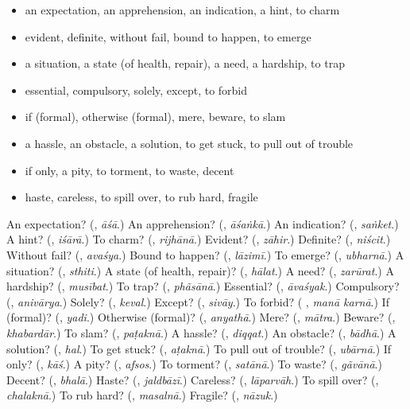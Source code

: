 \begin{itemize}
\raggedright
  \item an expectation, an apprehension, an indication, a hint, to charm
  \item evident, definite, without fail, bound to happen, to emerge
  \item a situation, a state (of health, repair), a need, a hardship, to trap
  \item essential, compulsory, solely, except, to forbid
  \item if (formal), otherwise (formal), mere, beware, to slam
  \item a hassle, an obstacle, a solution, to get stuck, to pull out of trouble
  \item if only, a pity, to torment, to waste, decent
  \item haste, careless, to spill over, to rub hard, fragile
\end{itemize}

\begin{tcolorbox}[breakable,colback=teal!4,colframe=teal!35!black,title={Before you move on}]
An expectation? (\textbf{}, \emph{āśā}.) An apprehension? (\textbf{}, \emph{āśaṅkā}.) An indication? (\textbf{}, \emph{saṅket}.) A hint? (\textbf{}, \emph{iśārā}.) To charm? (\textbf{}, \emph{rijhānā}.) Evident? (\textbf{}, \emph{zāhir}.) Definite? (\textbf{}, \emph{niścit}.) Without fail? (\textbf{}, \emph{avaśya}.) Bound to happen? (\textbf{}, \emph{lāzimī}.) To emerge? (\textbf{}, \emph{ubharnā}.) A situation? (\textbf{}, \emph{sthiti}.) A state (of health, repair)? (\textbf{}, \emph{hālat}.) A need? (\textbf{}, \emph{zarūrat}.) A hardship? (\textbf{}, \emph{musībat}.) To trap? (\textbf{}, \emph{phãsānā}.) Essential? (\textbf{}, \emph{āvaśyak}.) Compulsory? (\textbf{}, \emph{anivārya}.) Solely? (\textbf{}, \emph{keval}.) Except? (\textbf{}, \emph{sivāy}.) To forbid? (\textbf{ }, \emph{manā karnā}.) If (formal)? (\textbf{}, \emph{yadi}.) Otherwise (formal)? (\textbf{}, \emph{anyathā}.) Mere? (\textbf{}, \emph{mātra}.) Beware? (\textbf{}, \emph{khabardār}.) To slam? (\textbf{}, \emph{paṭaknā}.) A hassle? (\textbf{}, \emph{diqqat}.) An obstacle? (\textbf{}, \emph{bādhā}.) A solution? (\textbf{}, \emph{hal}.) To get stuck? (\textbf{}, \emph{aṭaknā}.) To pull out of trouble? (\textbf{}, \emph{ubārnā}.) If only? (\textbf{}, \emph{kāś}.) A pity? (\textbf{}, \emph{afsos}.) To torment? (\textbf{}, \emph{satānā}.) To waste? (\textbf{}, \emph{gãvānā}.) Decent? (\textbf{}, \emph{bhalā}.) Haste? (\textbf{}, \emph{jaldbāzī}.) Careless? (\textbf{}, \emph{lāparvāh}.) To spill over? (\textbf{}, \emph{chalaknā}.) To rub hard? (\textbf{}, \emph{masalnā}.) Fragile? (\textbf{}, \emph{nāzuk}.)
\end{tcolorbox}
